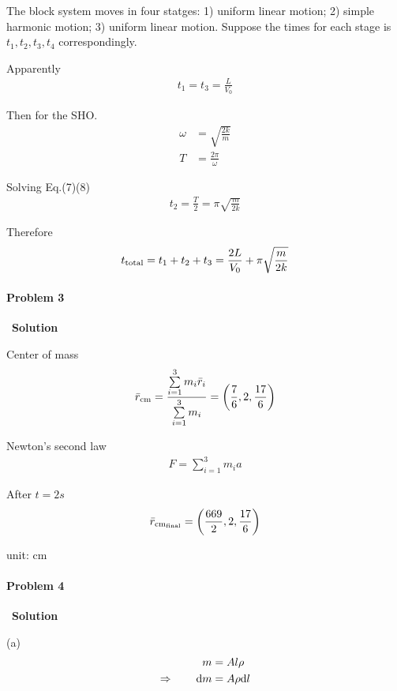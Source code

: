 \documentclass[12pt,a4paper]{article}
\begin{document}
The block system moves in four statges: 1) uniform linear motion; 2) simple
harmonic motion; 3) uniform linear motion. Suppose the times for each stage is $t_1,t_2,
t_3,t_4$ correspondingly.

Apparently
\begin{align}
    t_1 = t_3 = \frac{L}{V_0}
\end{align}

Then for the SHO.
\begin{align}
    \omega &= \sqrt{\frac{2k}{m}}\\
    T &= \frac{2\pi}{\omega}
\end{align}

Solving Eq.(7)(8)
\begin{align}
    t_2 = \frac{T}{2} = \pi\sqrt{\frac{m}{2k}}
\end{align}

Therefore
\begin{align}
    t_{\rm total} = t_1 + t_2 + t_3 = \frac{2L}{V_0} + \pi\sqrt{\frac{m}{2k}}
\end{align}

\paragraph{\large \textbf{Problem 3}}~{\textbf{Solution}}
\vspace{2mm}

Center of mass
\begin{align}
    \bar{r}_{\rm cm} = \frac{\sum\limits_{i=1}^3 m_i\bar{r}_i}{\sum\limits_{i=1}^3 m_i} =
    \left( \frac{7}{6},2,\frac{17}{6} \right)
\end{align}

Newton's second law
\begin{align}
    F = \sum\limits_{i=1}^3 m_i a
\end{align}

After $t=2s$
\begin{align}
    \bar{r}_{{\rm cm}_{\rm final}} = \left( \frac{669}{2},2,\frac{17}{6} \right)
\end{align}

unit: cm

\paragraph{\large \textbf{Problem 4}}~{\textbf{Solution}}
\vspace{2mm}

(a) 
\begin{align}
    m &= Al\rho\\
\Rightarrow\qquad {\rm d}m &= A\rho {\rm d}l
\end{align}
\end{document}

